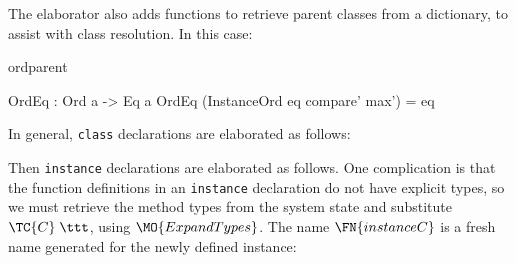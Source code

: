 
\noindent
The elaborator also adds functions to retrieve parent classes from a
dictionary, to assist with class resolution. In this case:

\begin{SaveVerbatim}{ordparent}

OrdEq : Ord a -> Eq a
OrdEq (InstanceOrd {{eq}} compare' max') = eq

\end{SaveVerbatim}

\noindent
In general, \texttt{class} declarations are elaborated as follows:


\noindent
Then \texttt{instance} declarations are elaborated as follows. One complication
is that the function definitions in an \texttt{instance} declaration do not
have explicit types, so we must retrieve the method types from the system state
and substitute $\TC{C}\;\ttt$, using $\MO{ExpandTypes}$.
The name $\FN{instanceC}$ is a fresh name generated for the newly
defined instance:


